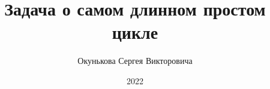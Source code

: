 \documentclass[spec, och, labwork]{shiza}
\begin{document}
\chair{}

\title{Задача о самом длинном простом цикле}






\author{Окунькова Сергея Викторовича}








\date{2022}

\maketitle

\end{document}
